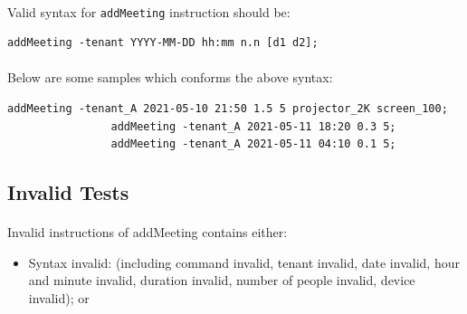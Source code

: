 \documentclass{article}
\begin{document}
            \paragraph{}
            Valid syntax for \texttt{addMeeting} instruction should be:
            \begin{Verbatim}[gobble=8]
                addMeeting -tenant YYYY-MM-DD hh:mm n.n [d1 d2]; 
            \end{Verbatim}
            \paragraph{}
            Below are some samples which conforms the above syntax:
            \begin{Verbatim}[gobble=8]
                addMeeting -tenant_A 2021-05-10 21:50 1.5 5 projector_2K screen_100;
                addMeeting -tenant_A 2021-05-11 18:20 0.3 5;
                addMeeting -tenant_A 2021-05-11 04:10 0.1 5;
            \end{Verbatim}
        
        
        \subsection{Invalid Tests}
            \paragraph{}
            Invalid instructions of addMeeting contains either:
            
            \begin{itemize}
            \item Syntax invalid: (including command invalid, tenant invalid, date invalid, hour and minute invalid,
            duration invalid, number of people invalid, device invalid); or
            \end{itemize}
            
\end{document}
